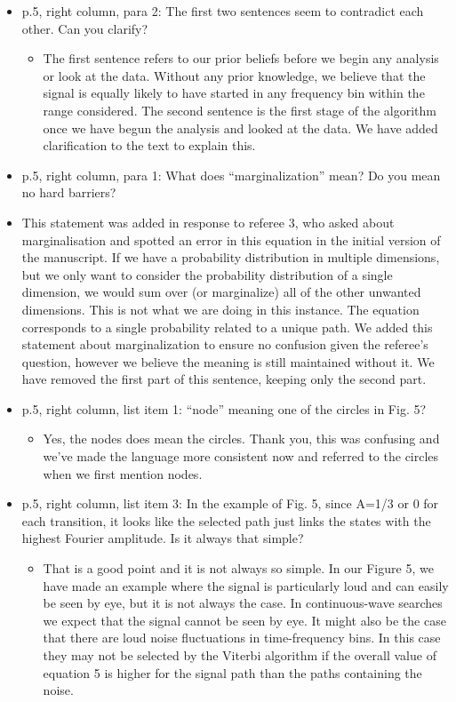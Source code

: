 \documentclass[a4paper, 10pt]{letter}
\begin{document}
\begin{itemize}
\item p.5, right column, para 2: The first two sentences seem to contradict each other. Can you clarify? 
\begin{itemize}
\item The first sentence refers to our prior beliefs before we begin any analysis or look at the data. Without any prior knowledge, we believe that the signal is equally likely to have started in any frequency bin within the range considered. The second sentence is the first stage of the algorithm once we have begun the analysis and looked at the data. We have added clarification to the text to explain this. 
\end{itemize}

\item p.5, right column, para 1: What does ``marginalization'' mean? Do you mean no hard barriers?
\item This statement was added in response to referee 3, who asked about marginalisation and spotted an error in this equation in the initial version of the manuscript. If we have a probability distribution in multiple dimensions, but we only want to consider the probability distribution of a single dimension, we would sum over (or marginalize) all of the other unwanted dimensions. This is not what we are doing in this instance. The equation corresponds to a single probability related to a unique path. We added this statement about marginalization to ensure no confusion given the referee's question, however we believe the meaning is still maintained without it. We have removed the first part of this sentence, keeping only the second part. 

\item p.5, right column, list item 1: ``node'' meaning one of the circles in Fig. 5? 
\begin{itemize}
\item Yes, the nodes does mean the circles. Thank you, this was confusing and we've made the language more consistent now and referred to the circles when we first mention nodes.
\end{itemize}

\item p.5, right column, list item 3: In the example of Fig. 5, since A=1/3 or 0 for each transition, it looks like the selected path just links the states with the highest Fourier amplitude. Is it always that simple?
\begin{itemize}
\item That is a good point and it is not always so simple. In our Figure 5, we have made an example where the signal is particularly loud and can easily be seen by eye, but it is not always the case. In continuous-wave searches we expect that the signal cannot be seen by eye. It might also be the case that there are loud noise fluctuations in time-frequency bins. In this case they may not be selected by the Viterbi algorithm if the overall value of equation 5 is higher for the signal path than the paths containing the noise. 
\end{itemize}


\end{itemize}
\end{document}
